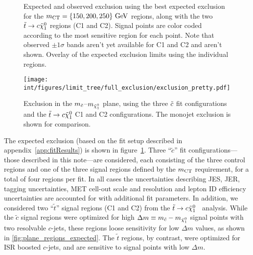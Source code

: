 \begin{figure}
\begin{center}
\end{center}
\caption[Exclusion in the $m_{\scharm}$--$m_{\neut}$ plane by signal region]
{ Expected and observed exclusion using the best expected exclusion for the $m_{\rm CT} = \{150, 200, 250\}\text{ GeV}$ regions, along with the two $\tilde{t} \to c \tilde{\chi}_1^0$ regions (C1 and C2). Signal points are color coded
according to the most sensitive region for each point. Note that observed $\pm 1 \sigma$ bands aren't yet available for C1 and C2 and aren't shown.  Overlay of the expected exclusion limits using the individual regions.}
\label{fig:exclusion_plane_regions}
\end{figure}

\begin{figure}
\texttt{[image: int/figures/limit\_tree/full\_exclusion/exclusion\_pretty.pdf]}
\caption[Exclusion in the $m_{\scharm}$--$m_{\neut}$ plane]{
Exclusion in the $m_{\scharm}$--$m_{\neut}$ plane, using the three $\tilde{c}$ fit configurations and the $\tilde{t} \to c \tilde{\chi}_1^0$ C1 and C2 configurations. The monojet exclusion is shown for comparison.}
\label{fig:plane_pretty_regions}
\end{figure}

The expected exclusion (based on the fit setup described in
appendix~\ref{app:fitResults}) is shown in
figure~\ref{fig:exclusion_plane_regions}. Three ``$\tilde{c}$'' fit
configurations---those described in this note---are considered, each
consisting of the three control regions and one of the three signal
regions defined by the $m_{\rm CT}$ requirement, for a total of four regions
per fit. In all cases the uncertainties describing JES, JER, tagging
uncertainties, MET cell-out scale and resolution and lepton ID
efficiency uncertainties are accounted for with additional fit
parameters. In addition, we considered two ``$\tilde{t}$'' signal
regions (C1 and C2) from the $\tilde{t} \to c
\tilde{\chi}_1^0$~\cite{stopCharmATLAS} analysis. While the $\tilde{c}$
signal regions were optimized for high $\Delta m \equiv m_{\tilde{c}} - m_{\tilde{\chi}_1^0}$
signal points with two resolvable $c$-jets, these regions loose
sensitivity for low $\Delta m$ values, as shown in
\cref{fig:plane_regions_expected}. The $\tilde{t}$ regions, by
contrast, were optimized for ISR boosted $c$-jets, and are sensitive
to signal points with low $\Delta m$.

